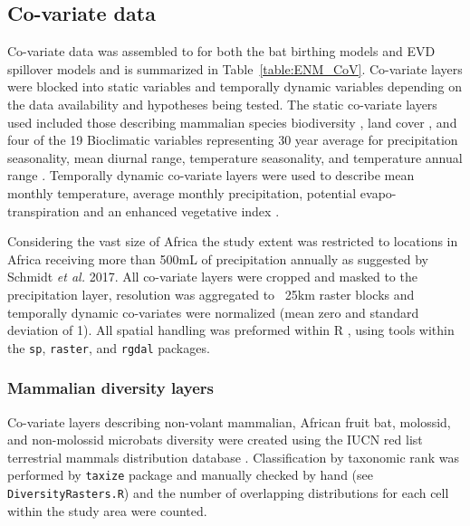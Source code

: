 \documentclass[9pt,twoside,lineno]{pnas-new}
\begin{document}
\subsection*{Co-variate data}
\label{CoV}
Co-variate data was assembled to for both the bat birthing models and EVD spillover models and is summarized in Table~\ref{table:ENM_CoV}. Co-variate layers were blocked into static variables and temporally dynamic variables depending on the data availability and hypotheses being tested. The static co-variate layers used included those describing mammalian species biodiversity \cite{IUCN2016TerrestrialData}, land cover \cite{Olivier2012Global2009}, and four of the 19 Bioclimatic variables representing 30 year average for precipitation seasonality, mean diurnal range, temperature seasonality, and temperature annual range \cite{Frick2017WorldclimArease}. Temporally dynamic co-variate layers were used to describe mean monthly temperature, average monthly precipitation, potential evapo-transpiration \cite{Trabucco2009GlobalDatabase} and an enhanced vegetative index \cite{Huete2002OverviewIndices}.\par
Considering the vast size of Africa the study extent was restricted to locations in Africa receiving more than 500mL of precipitation annually as suggested by Schmidt \textit{et al.} 2017\cite{Schmidt2017SpatiotemporalSpillover}. All co-variate layers were cropped and  masked to the precipitation layer, resolution was aggregated to ~25km raster blocks and temporally dynamic co-variates were normalized (mean zero and standard deviation of 1). All spatial handling was preformed within R \cite{Team2017R:Computing}, using tools within the \texttt{sp}\cite{Pebesma2005ClassesR}, \texttt{raster}\cite{Hijmans2016Raster:Modeling}, and \texttt{rgdal}\cite{Bivand2017Rgdal:Library} packages.\par
\subsubsection*{Mammalian diversity layers}
Co-variate layers describing non-volant mammalian, African fruit bat, molossid, and non-molossid microbats diversity were created using the IUCN red list terrestrial mammals distribution database \cite{IUCN2016TerrestrialData}. Classification by taxonomic rank was performed by \texttt{taxize} package \cite{Chamberlain2013Taxize:R} and manually checked by hand (see \texttt{DiversityRasters.R}) and the number of overlapping distributions for each cell within the study area were counted.\par
\end{document}
